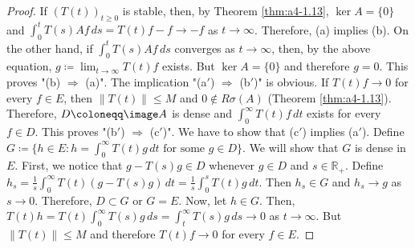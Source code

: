 \begin{proof}
If $(T(t))_{t \geq 0}$ is stable, then, by Theorem \ref{thm:a4-1.13}, $\ker A = \{0\}$ and
$\int_{0}^{t} T(s)Af \, ds = T(t)f - f \to -f$ as $t \to \infty$. 
Therefore, (a) implies (b).
On the other hand, if $\int_{0}^{t} T(s)Af \, ds$ converges as $t \to \infty$, then, by
the above equation, $g \coloneqq \lim_{t \to \infty} T(t)f$ exists. 
But $\ker A = \{0\}$ and
therefore $g = 0$. 
This proves "(b) $\Rightarrow$ (a)".
The implication "(a$'$) $\Rightarrow$ (b$'$)" is obvious. 
If $T(t)f \to 0$ for every $f \in E$, then $\|T(t)\| \leq M$ and $0 \not\in R\sigma(A)$ (Theorem \ref{thm:a4-1.13}). 
Therefore,
$D \coloneqq \image A$ is dense and $\int_{0}^{\infty} T(t)f \, dt$ exists for every $f \in D$. 
This proves "(b$'$) $\Rightarrow$ (c$'$)". 
We have to show that (c$'$) implies (a$'$).
Define $G \coloneqq \{h \in E : h = \int_{0}^{\infty} T(t)g \, dt \text{ for some } g \in D\}$. 
We will show
that $G$ is dense in $E$. 
First, we notice that $g - T(s)g \in D$ whenever $g \in D$
and $s \in \mathbb{R}_{+}$.
Define $h_{s} = \frac{1}{s} \int_{0}^{\infty} T(t)(g - T(s)g) \, dt = \frac{1}{s} \int_{0}^{s} T(t)g \, dt$. 
Then $h_{s} \in G$
and $h_{s} \to g$ as $s \to 0$. 
Therefore, $D \subset G$ or $G = E$. 
Now, let $h \in G$.
Then, $T(t)h = T(t) \int_{0}^{\infty} T(s)g \, ds = \int_{t}^{\infty} T(s)g \, ds \to 0$ as $t \to \infty$. 
But $\|T(t)\| \leq M$ and therefore $T(t)f \to 0$ for every $f \in E$.
\end{proof}


